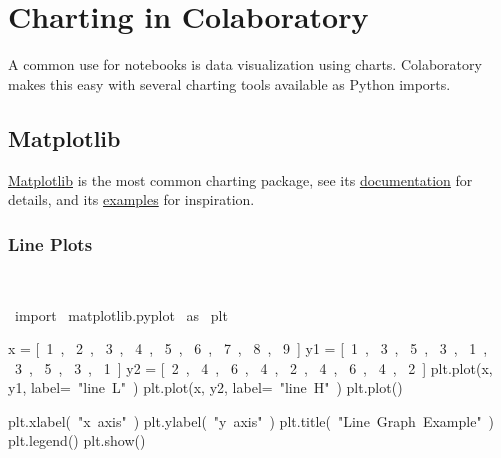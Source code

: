 \section{Charting in Colaboratory}
A common use for notebooks is data visualization using charts. Colaboratory makes this easy with several charting tools available as Python imports.\\
\subsection{Matplotlib}
\href{http://matplotlib.org/}{Matplotlib} is the most common charting package, see its \href{http://matplotlib.org/api/pyplot\_api.html}{documentation} for details, and its \href{http://matplotlib.org/gallery.html#statistics}{examples} for inspiration.\\
\subsubsection{Line Plots}

\begin{paracol}{2}
\smallskip
\begin{cellExecute}[escapechar=~]
~~
\end{cellExecute}
\switchcolumn
\begin{codeCell}[escapechar=~]
~\textcolor{mtk17}{import}~ matplotlib.pyplot ~\textcolor{mtk17}{as}~ plt

x  = [~\textcolor{mtk7}{1}~, ~\textcolor{mtk7}{2}~, ~\textcolor{mtk7}{3}~, ~\textcolor{mtk7}{4}~, ~\textcolor{mtk7}{5}~, ~\textcolor{mtk7}{6}~, ~\textcolor{mtk7}{7}~, ~\textcolor{mtk7}{8}~, ~\textcolor{mtk7}{9}~]
y1 = [~\textcolor{mtk7}{1}~, ~\textcolor{mtk7}{3}~, ~\textcolor{mtk7}{5}~, ~\textcolor{mtk7}{3}~, ~\textcolor{mtk7}{1}~, ~\textcolor{mtk7}{3}~, ~\textcolor{mtk7}{5}~, ~\textcolor{mtk7}{3}~, ~\textcolor{mtk7}{1}~]
y2 = [~\textcolor{mtk7}{2}~, ~\textcolor{mtk7}{4}~, ~\textcolor{mtk7}{6}~, ~\textcolor{mtk7}{4}~, ~\textcolor{mtk7}{2}~, ~\textcolor{mtk7}{4}~, ~\textcolor{mtk7}{6}~, ~\textcolor{mtk7}{4}~, ~\textcolor{mtk7}{2}~]
plt.plot(x, y1, label=~\textcolor{mtk25}{"line L"}~)
plt.plot(x, y2, label=~\textcolor{mtk25}{"line H"}~)
plt.plot()

plt.xlabel(~\textcolor{mtk25}{"x axis"}~)
plt.ylabel(~\textcolor{mtk25}{"y axis"}~)
plt.title(~\textcolor{mtk25}{"Line Graph Example"}~)
plt.legend()
plt.show()
\end{codeCell}
\end{paracol}

